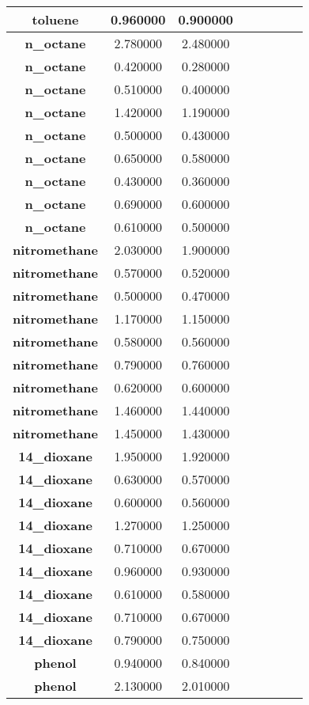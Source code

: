 \documentclass{amsart}
\begin{document}
\begin{center}
\begin{tabular}{c|c|c|c|c|c|c|c}
\textbf{toluene}&0.960000&0.900000 \\ \hline 
\textbf{n\_octane}&2.780000&2.480000 \\ \hline 
\textbf{n\_octane}&0.420000&0.280000 \\ \hline 
\textbf{n\_octane}&0.510000&0.400000 \\ \hline 
\textbf{n\_octane}&1.420000&1.190000 \\ \hline 
\textbf{n\_octane}&0.500000&0.430000 \\ \hline 
\textbf{n\_octane}&0.650000&0.580000 \\ \hline 
\textbf{n\_octane}&0.430000&0.360000 \\ \hline 
\textbf{n\_octane}&0.690000&0.600000 \\ \hline 
\textbf{n\_octane}&0.610000&0.500000 \\ \hline 
\textbf{nitromethane}&2.030000&1.900000 \\ \hline 
\textbf{nitromethane}&0.570000&0.520000 \\ \hline 
\textbf{nitromethane}&0.500000&0.470000 \\ \hline 
\textbf{nitromethane}&1.170000&1.150000 \\ \hline 
\textbf{nitromethane}&0.580000&0.560000 \\ \hline 
\textbf{nitromethane}&0.790000&0.760000 \\ \hline 
\textbf{nitromethane}&0.620000&0.600000 \\ \hline 
\textbf{nitromethane}&1.460000&1.440000 \\ \hline 
\textbf{nitromethane}&1.450000&1.430000 \\ \hline 
\textbf{14\_dioxane}&1.950000&1.920000 \\ \hline 
\textbf{14\_dioxane}&0.630000&0.570000 \\ \hline 
\textbf{14\_dioxane}&0.600000&0.560000 \\ \hline 
\textbf{14\_dioxane}&1.270000&1.250000 \\ \hline 
\textbf{14\_dioxane}&0.710000&0.670000 \\ \hline 
\textbf{14\_dioxane}&0.960000&0.930000 \\ \hline 
\textbf{14\_dioxane}&0.610000&0.580000 \\ \hline 
\textbf{14\_dioxane}&0.710000&0.670000 \\ \hline 
\textbf{14\_dioxane}&0.790000&0.750000 \\ \hline 
\textbf{phenol}&0.940000&0.840000 \\ \hline 
\textbf{phenol}&2.130000&2.010000 \\ \hline 

\end{tabular}
\end{center}
\end{document}
